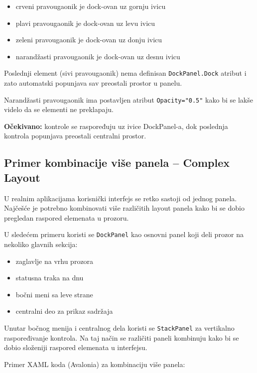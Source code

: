 \documentclass[11pt,a4paper]{article}
\begin{document}
\begin{itemize}[leftmargin=*]
  \item crveni pravougaonik je dock-ovan uz gornju ivicu
  \item plavi pravougaonik je dock-ovan uz levu ivicu
  \item zeleni pravougaonik je dock-ovan uz donju ivicu
  \item narandžasti pravougaonik je dock-ovan uz desnu ivicu
\end{itemize}

Poslednji element (sivi pravougaonik) nema definisan \texttt{DockPanel.Dock} atribut i zato automatski popunjava sav preostali prostor u panelu.

Narandžasti pravougaonik ima postavljen atribut \texttt{Opacity="0.5"} kako bi se lakše videlo da se elementi ne preklapaju.

\textbf{Očekivano:} kontrole se raspoređuju uz ivice DockPanel-a, dok poslednja kontrola popunjava preostali centralni prostor.

\subsection{Primer kombinacije više panela – Complex Layout}

U realnim aplikacijama korisnički interfejs se retko sastoji od jednog panela. 
Najčešće je potrebno kombinovati više različitih layout panela kako bi se dobio 
pregledan raspored elemenata u prozoru.

U sledećem primeru koristi se \texttt{DockPanel} kao osnovni panel koji deli 
prozor na nekoliko glavnih sekcija:

\begin{itemize}[leftmargin=*]
  \item zaglavlje na vrhu prozora
  \item statusna traka na dnu
  \item bočni meni sa leve strane
  \item centralni deo za prikaz sadržaja
\end{itemize}

Unutar bočnog menija i centralnog dela koristi se \texttt{StackPanel} za 
vertikalno raspoređivanje kontrola. Na taj način se različiti paneli 
kombinuju kako bi se dobio složeniji raspored elemenata u interfejsu.

Primer XAML koda (Avalonia) za kombinaciju više panela:
\end{document}
